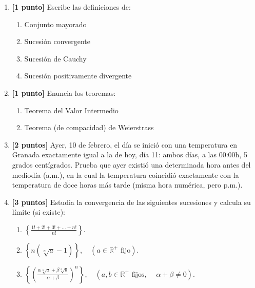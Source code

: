 \documentclass[12pt]{article}
\begin{document}
    \begin{enumerate}
        \item \textbf{[1 punto]} Escribe las definiciones de:
        \begin{enumerate}
            \item Conjunto mayorado
            \item Sucesión convergente
            \item Sucesión de Cauchy
            \item Sucesión positivamente divergente
        \end{enumerate}
    
        \item \textbf{[1 punto]} Enuncia los teoremas:
        \begin{enumerate}
            \item Teorema del Valor Intermedio
            \item Teorema (de compacidad) de Weierstrass
        \end{enumerate}
    
        \item \textbf{[2 puntos]} Ayer, 10 de febrero, el día se inició con una temperatura en Granada exactamente igual a la de hoy, día 11: ambos días, a las 00:00h, 5 grados centígrados. Prueba que ayer existió una determinada hora antes del mediodía (a.m.), en la cual la temperatura coincidió exactamente con la temperatura de doce horas más tarde (misma hora numérica, pero p.m.).
    
        \item \textbf{[3 puntos]} Estudia la convergencia de las siguientes sucesiones y calcula su límite (si existe):
    
        \begin{enumerate}
            \item $ \displaystyle
            \left\{ \frac{1! + 2! + 3! + \dots + n!}{n!} \right\}
            $.
    
            \item $ \displaystyle
            \left\{ n \left( \sqrt[n]{a} -1 \right) \right\}, \quad (a\in\mathbb{R}^+ \text{ fijo}).
            $
    
            \item $ \displaystyle
            \left\{ \left( \frac{\alpha \sqrt[n]{a} + \beta \sqrt[n]{b}}{\alpha + \beta} \right)^n \right\}, \quad (a,b\in\mathbb{R}^+ \text{ fijos, }\quad \alpha + \beta \neq 0).
            $
        \end{enumerate}
    

\end{enumerate}
\end{document}
